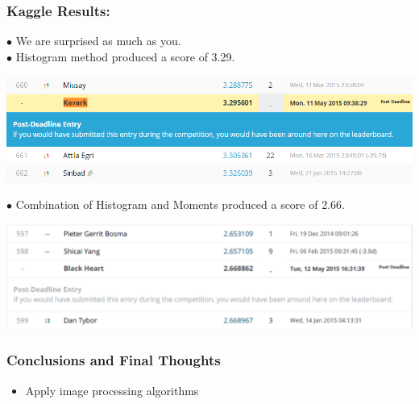 \documentclass{beamer}
\begin{document}
\begin{frame}
	\frametitle{Kaggle Results:}
$\bullet$ We are surprised as much as you.\\
$\bullet$ Histogram method produced a score of 3.29. \\
\begin{center}
	\includegraphics[scale=0.3]{submission.png}
\end{center}
$\bullet$ Combination of Histogram and Moments produced a score of 2.66. \\
\begin{center}
	\includegraphics[scale=0.25]{combined.png}
\end{center}
\end{frame}


\begin{frame}
	\frametitle{Conclusions and Final Thoughts}
	\begin{itemize}
		\item Apply image processing algorithms 
	\end{itemize}
\end{frame}
\end{document}
